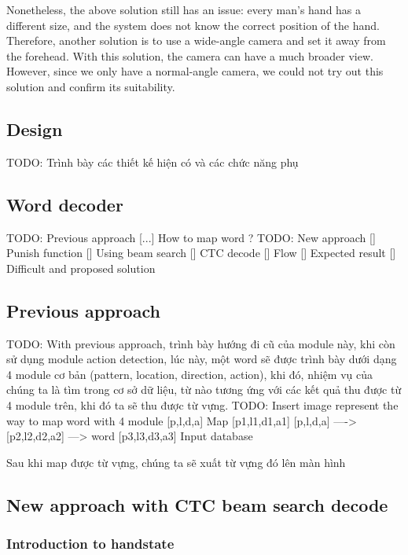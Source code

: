Nonetheless, the above solution still has an issue: every man’s hand has a different size, and the system does not know the correct position of the hand. Therefore, another solution is to use a wide-angle camera and set it away from the forehead. With this solution, the camera can have a much broader view. However, since we only have a normal-angle camera, we could not try out this solution and confirm its suitability.

\subsection{ Design}
  TODO: Trình bày các thiết kế hiện có và các chức năng phụ

\subsection{Word decoder}

TODO:   Previous approach 
      [...] How to map word ?
TODO:   New approach
      [] Punish function
      [] Using beam search
      [] CTC decode
      [] Flow
      [] Expected result
      [] Difficult and proposed solution

  \subsection{ Previous approach}
    TODO: With previous approach, trình bày hướng đi
    cũ của module này, khi còn sử dụng module action
    detection, lúc này, một word sẽ được trình bày dưới
    dạng 4 module cơ bản (pattern, location, direction, action),
    khi đó, nhiệm vụ của chúng ta là tìm trong cơ sở dữ liệu, từ nào
    tương ứng với các kết quả thu được từ 4 module trên, khi đó
    ta sẽ thu được từ vựng.
    TODO: Insert image represent the way to map word with 4 module
                              [p,l,d,a]
                        Map   [p1,l1,d1,a1]
              [p,l,d,a] ----> [p2,l2,d2,a2] ---> word
                              [p3,l3,d3,a3]
              Input             database

    Sau khi map được từ vựng, chúng ta sẽ xuất từ vựng đó lên màn hình

    \subsection{ New approach with CTC beam search decode }
      \subsubsection{ Introduction to handstate }
